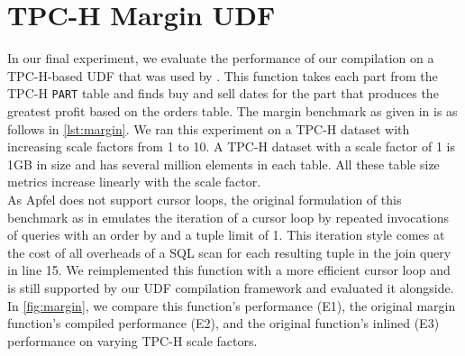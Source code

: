 \documentclass[12pt]{cmuthesis}
\newcommand{\dbTable}[1]{\texttt{\MakeUppercase{#1}}\xspace}
\begin{document}
    \section{TPC-H Margin UDF}
      In our final experiment, we evaluate the performance of our compilation on a TPC-H-based UDF that was used by \citeauthor{duta19} \cite{duta19}. This function takes each part from the TPC-H \dbTable{part} table and finds buy and sell dates for the part that produces the greatest profit based on the orders table. The margin benchmark as given in \cite{duta19} is as follows in \cref{lst:margin}. We ran this experiment on a TPC-H dataset with increasing scale factors from 1 to 10. A TPC-H dataset with a scale factor of 1 is 1GB in size and has several million elements in each table. All these table size metrics increase linearly with the scale factor.\\


    

        As Apfel does not support cursor loops, the original formulation of this benchmark as in \cite{duta19} emulates 
        the iteration of a
        cursor loop by repeated invocations of queries with an order by and a tuple limit of 1.
        This iteration style comes at the cost of all overheads of a SQL scan for each resulting tuple in the join query in line 15. We reimplemented this function with a more efficient cursor loop 
        and is still supported by our UDF compilation framework and evaluated it alongside.
        In \cref{fig:margin}, we compare this function's performance (E1), the original margin 
        function's compiled performance (E2), and the original function's inlined (E3) performance on varying TPC-H
        scale factors.\\
        
\end{document}
